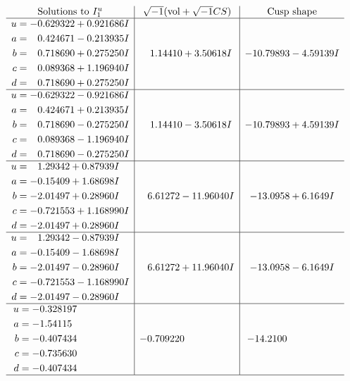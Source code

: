 \documentclass[1p]{elsarticle_modified}
\theoremstyle{definition}
\newcommand{\I}{\sqrt{-1}}
\begin{document}
$$\begin{array}{c|c|c}  
\text{Solutions to }I^u_{1}& \I (\text{vol} + \sqrt{-1}CS) & \text{Cusp shape}\\
 \hline 
\begin{aligned}
u &= -0.629322 + 0.921686 I \\
a &= \phantom{-}0.424671 - 0.213935 I \\
b &= \phantom{-}0.718690 + 0.275250 I \\
c &= \phantom{-}0.089368 + 1.196940 I \\
d &= \phantom{-}0.718690 + 0.275250 I\end{aligned}
 & \phantom{-}1.14410 + 3.50618 I & -10.79893 - 4.59139 I \\ \hline\begin{aligned}
u &= -0.629322 - 0.921686 I \\
a &= \phantom{-}0.424671 + 0.213935 I \\
b &= \phantom{-}0.718690 - 0.275250 I \\
c &= \phantom{-}0.089368 - 1.196940 I \\
d &= \phantom{-}0.718690 - 0.275250 I\end{aligned}
 & \phantom{-}1.14410 - 3.50618 I & -10.79893 + 4.59139 I \\ \hline\begin{aligned}
u &= \phantom{-}1.29342 + 0.87939 I \\
a &= -0.15409 + 1.68698 I \\
b &= -2.01497 + 0.28960 I \\
c &= -0.721553 + 1.168990 I \\
d &= -2.01497 + 0.28960 I\end{aligned}
 & \phantom{-}6.61272 - 11.96040 I & -13.0958 + 6.1649 I \\ \hline\begin{aligned}
u &= \phantom{-}1.29342 - 0.87939 I \\
a &= -0.15409 - 1.68698 I \\
b &= -2.01497 - 0.28960 I \\
c &= -0.721553 - 1.168990 I \\
d &= -2.01497 - 0.28960 I\end{aligned}
 & \phantom{-}6.61272 + 11.96040 I & -13.0958 - 6.1649 I \\ \hline\begin{aligned}
u &= -0.328197\phantom{ +0.000000I} \\
a &= -1.54115\phantom{ +0.000000I} \\
b &= -0.407434\phantom{ +0.000000I} \\
c &= -0.735630\phantom{ +0.000000I} \\
d &= -0.407434\phantom{ +0.000000I}\end{aligned}
 & -0.709220\phantom{ +0.000000I} & -14.2100\phantom{ +0.000000I}\\
 \hline 
 \end{array}$$\newpage\newpage\renewcommand{\arraystretch}{1}
\end{document}
